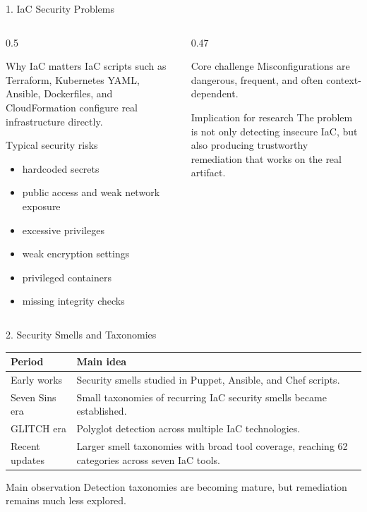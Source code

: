 \documentclass[aspectratio=169,10pt]{beamer}
\begin{document}
\begin{frame}{1. IaC Security Problems}
\begin{columns}[T]
\begin{column}{0.5\textwidth}
\begin{block}{Why IaC matters}
\small
IaC scripts such as Terraform, Kubernetes YAML, Ansible, Dockerfiles, and CloudFormation configure real infrastructure directly.
\end{block}
\begin{block}{Typical security risks}
\small
\begin{itemize}
  \item hardcoded secrets
  \item public access and weak network exposure
  \item excessive privileges
  \item weak encryption settings
  \item privileged containers
  \item missing integrity checks
\end{itemize}
\end{block}
\end{column}
\begin{column}{0.47\textwidth}
\begin{block}{Core challenge}
\small
Misconfigurations are dangerous, frequent, and often context-dependent.
\end{block}
\begin{block}{Implication for research}
\small
The problem is not only detecting insecure IaC, but also producing trustworthy remediation that works on the real artifact.
\end{block}
\end{column}
\end{columns}
\end{frame}

\begin{frame}{2. Security Smells and Taxonomies}
\begin{tabularx}{\linewidth}{>{\raggedright\arraybackslash}p{2.8cm}X}
\toprule
\textbf{Period} & \textbf{Main idea} \\
\midrule
Early works & Security smells studied in Puppet, Ansible, and Chef scripts. \\
Seven Sins era & Small taxonomies of recurring IaC security smells became established. \\
GLITCH era & Polyglot detection across multiple IaC technologies. \\
Recent updates & Larger smell taxonomies with broad tool coverage, reaching 62 categories across seven IaC tools. \\
\bottomrule
\end{tabularx}
\vspace{0.4cm}
\begin{alertblock}{Main observation}
Detection taxonomies are becoming mature, but remediation remains much less explored.
\end{alertblock}
\end{frame}
\end{document}
